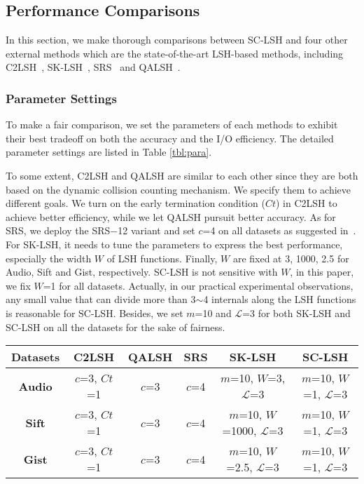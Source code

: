 \documentclass[twocolumn]{svjour3}          %
\begin{document}
\subsection{Performance Comparisons}
In this section, we make thorough comparisons between SC-LSH and four other external methods which are the state-of-the-art LSH-based methods, including C2LSH~\cite{Gan2012C2LSH}, SK-LSH~\cite{Liu2014SKLSH}, SRS~\cite{Sun2014SRS} and QALSH~\cite{Huang2015QALSH}.

\subsubsection{Parameter Settings}\label{sssec:ps}
To make a fair comparison, we set the parameters of each methods to exhibit their best tradeoff on both the accuracy and the I/O efficiency. The detailed parameter settings are listed in Table \ref{tbl:para}.

To some extent, C2LSH and QALSH are similar to each other since they are both based on the dynamic collision counting mechanism. We specify them to achieve different goals. We turn on the early termination condition ($Ct$) in C2LSH to achieve better efficiency, while we let QALSH pursuit better accuracy. As for SRS, we deploy the SRS$-$12 variant and set $c$=4 on all datasets as suggested in~\cite{Sun2014SRS}. For SK-LSH, it needs to tune the parameters to express the best performance, especially the width $W$ of LSH functions. Finally, $W$ are fixed at 3, 1000, 2.5 for Audio, Sift and Gist, respectively. SC-LSH is not sensitive with $W$, in this paper, we fix $W$=1 for all datasets. Actually, in our practical experimental observations, any small value that can divide more than 3$\sim$4 internals along the LSH functions is reasonable for SC-LSH. Besides, we set $m$=10 and $\mathcal{L}$=3 for both SK-LSH and SC-LSH on all the datasets for the sake of fairness.
\begin{table*}[t]
	\centering
	\caption{Parameter settings}\label{tbl:para}
	\begin{tabular}{|c|c|c|c|c|c|}
		\hline
		Datasets & C2LSH & QALSH & SRS & SK-LSH & SC-LSH\\
		\hline
		\textbf{Audio} & $c$=3, $Ct$=1 & $c$=3 & $c$=4 & $m$=10, $W$=3, $\mathcal{L}$=3 & $m$=10, $W$=1, $\mathcal{L}$=3 \\
		\textbf{Sift} & $c$=3, $Ct$=1 & $c$=3 & $c$=4 & $m$=10, $W$=1000, $\mathcal{L}$=3 & $m$=10, $W$=1, $\mathcal{L}$=3 \\
		\textbf{Gist} & $c$=3, $Ct$=1 & $c$=3 & $c$=4 & $m$=10, $W$=2.5, $\mathcal{L}$=3 & $m$=10, $W$=1, $\mathcal{L}$=3\\
		\hline
	\end{tabular}
\end{table*}%
\end{document}
